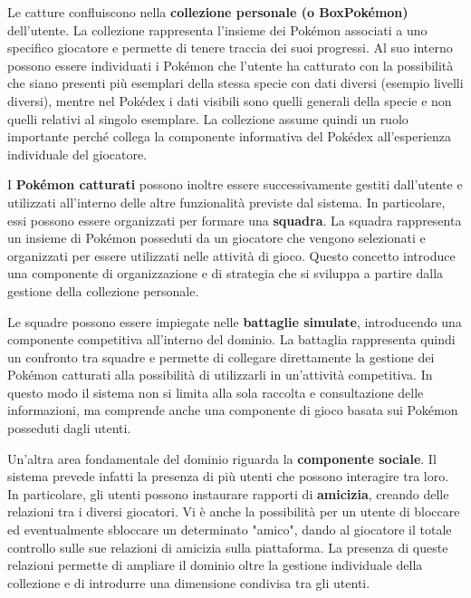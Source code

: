 \documentclass[a4paper,12pt]{report}
\begin{document}
\vspace{0,5 cm}
Le catture confluiscono nella \textbf{collezione personale (o BoxPokémon)} dell'utente. La collezione rappresenta l'insieme dei Pokémon associati a uno specifico giocatore e permette di tenere traccia dei suoi progressi. Al suo interno possono essere individuati i Pokémon che l'utente ha catturato con la possibilità che siano presenti più esemplari della stessa specie con dati diversi (esempio livelli diversi), mentre nel Pokédex i dati visibili sono quelli generali della specie e non quelli relativi al singolo esemplare. La collezione assume quindi un ruolo importante perché collega la componente informativa del Pokédex all'esperienza individuale del giocatore.

\vspace{0,5 cm}
I \textbf{Pokémon catturati} possono inoltre essere successivamente gestiti dall'utente e utilizzati all'interno delle altre funzionalità previste dal sistema. In particolare, essi possono essere organizzati per formare una \textbf{squadra}. La squadra rappresenta un insieme di Pokémon posseduti da un giocatore che vengono selezionati e organizzati per essere utilizzati nelle attività di gioco. Questo concetto introduce una componente di organizzazione e di strategia che si sviluppa a partire dalla gestione della collezione personale.

\vspace{0,5 cm}
Le squadre possono essere impiegate nelle \textbf{battaglie simulate}, introducendo una componente competitiva all'interno del dominio. La battaglia rappresenta quindi un confronto tra squadre e permette di collegare direttamente la gestione dei Pokémon catturati alla possibilità di utilizzarli in un'attività competitiva. In questo modo il sistema non si limita alla sola raccolta e consultazione delle informazioni, ma comprende anche una componente di gioco basata sui Pokémon posseduti dagli utenti.

\vspace{0,5 cm}
Un'altra area fondamentale del dominio riguarda la \textbf{componente sociale}. Il sistema prevede infatti la presenza di più utenti che possono interagire tra loro. In particolare, gli utenti possono instaurare rapporti di \textbf{amicizia}, creando delle relazioni tra i diversi giocatori. Vi è anche la possibilità per un utente di bloccare ed eventualmente sbloccare un determinato "amico", dando al giocatore il totale controllo sulle sue relazioni di amicizia sulla piattaforma. La presenza di queste relazioni permette di ampliare il dominio oltre la gestione individuale della collezione e di introdurre una dimensione condivisa tra gli utenti.
\end{document}
